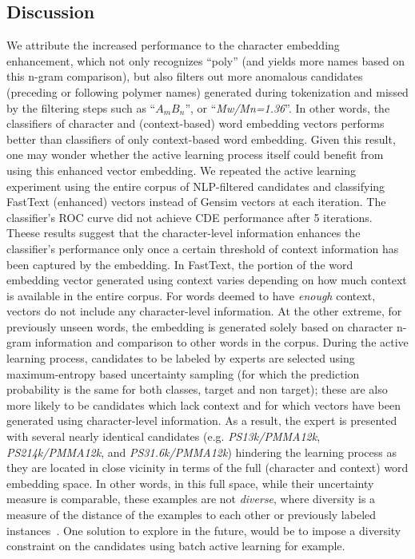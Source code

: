 \subsection{Discussion}
\label{sec:discussion}
We attribute the increased performance to the character embedding enhancement, which not only recognizes ``poly'' (and yields more names based on this n-gram comparison), but also filters out more anomalous candidates (preceding or following polymer names) generated during tokenization and missed by the filtering steps such as ``\textit{$A_mB_n$}'', or ``\textit{Mw/Mn=1.36}''.  
In other words, the classifiers of character and (context-based) word embedding vectors performs better than classifiers of only context-based word embedding.
Given this result, one may wonder whether the active learning process itself could benefit from using this enhanced vector embedding. 
We repeated the active learning experiment using the entire corpus of NLP-filtered candidates and classifying FastText (enhanced) vectors instead of Gensim vectors at each iteration. 
The classifier's ROC curve did not achieve CDE performance after 5 iterations.
Theese results suggest that the character-level information enhances the classifier's performance only once a certain threshold of context information has been captured by the embedding.
In FastText, the portion of the word embedding vector generated using context varies depending on how much context is available in the entire corpus. 
For words deemed to have \textit{enough} context, vectors do not include any character-level information. 
At the other extreme, for previously unseen words, the embedding is generated solely based on character n-gram information and comparison to other words in the corpus.
During the active learning process, candidates to be labeled by experts are selected using maximum-entropy based uncertainty sampling (for which the prediction probability is the same for both classes, target and non target);
these are also more likely to be candidates which lack context and for which vectors have been generated using character-level information. 
As a result, the expert is presented with several nearly identical candidates (e.g. \textit{PS13k/PMMA12k}, \textit{PS214k/PMMA12k}, and \textit{PS31.6k/PMMA12k}) hindering the learning process as they are located in close vicinity in terms of the full (character and context) word embedding space.
In other words, in this full space, while their uncertainty measure is comparable, these examples are not \textit{diverse}, where diversity is a measure of the distance of the examples to each other or previously labeled instances~\cite{brinker2003incorporating}.
One solution to explore in the future, would be to impose a diversity constraint on the candidates using batch active learning for example.
 
